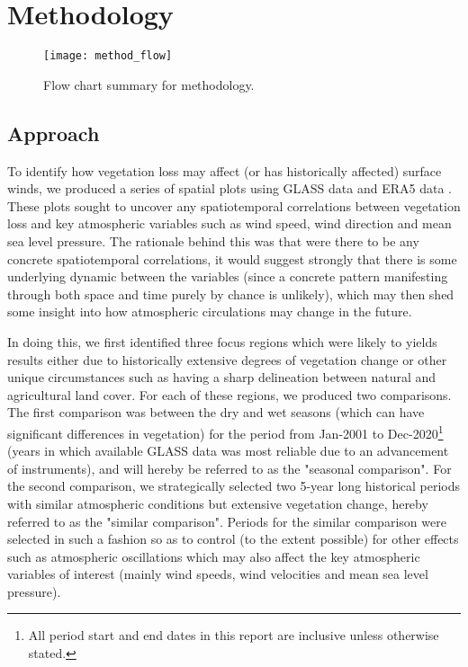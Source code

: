 \chapter{Methodology}
\label{ch:method}

\begin{figure}[!ht]
	\centering
	\texttt{[image: method\_flow]}
	\caption[Methodology Flow Chart]{Flow chart summary for methodology.}
	\label{fig:method_flow}
\end{figure}

\section{Approach}

To identify how vegetation loss may affect (or has historically affected) surface winds, we produced a series of spatial plots using \ac{GLASS} data \citep{liang2021} and \ac{ERA5} data \citep{era5}. These plots sought to uncover any spatiotemporal correlations between vegetation loss and key atmospheric variables such as wind speed, wind direction and mean sea level pressure. The rationale behind this was that were there to be any concrete spatiotemporal correlations, it would suggest strongly that there is some underlying dynamic between the variables (since a concrete pattern manifesting through both space and time purely by chance is unlikely), which may then shed some insight into how atmospheric circulations may change in the future.

In doing this, we first identified three focus regions which were likely to yields results either due to historically extensive degrees of vegetation change or other unique circumstances such as having a sharp delineation between natural and agricultural land cover. For each of these regions, we produced two comparisons. The first comparison was between the dry and wet seasons (which can have significant differences in vegetation) for the period from Jan-2001 to Dec-2020\footnote{All period start and end dates in this report are inclusive unless otherwise stated.} (years in which available \ac{GLASS} data was most reliable due to an advancement of instruments), and will hereby be referred to as the "seasonal comparison". For the second comparison, we strategically selected two 5-year long historical periods with similar atmospheric conditions but extensive vegetation change, hereby referred to as the "similar comparison". Periods for the similar comparison were selected in such a fashion so as to control (to the extent possible) for other effects such as atmospheric oscillations which may also affect the key atmospheric variables of interest (mainly wind speeds, wind velocities and mean sea level pressure).

